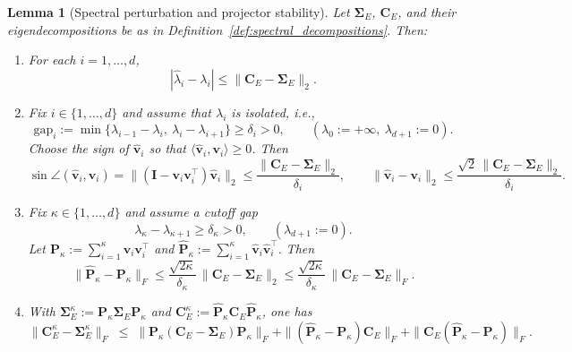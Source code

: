 \documentclass[11pt,a4paper]{article}
\newtheorem{lemma}{Lemma}
\begin{document}
\begin{lemma}[Spectral perturbation and projector stability]
\label{lem:covariance_concentration}
Let $\boldsymbol{\Sigma}_E$, $\mathbf{C}_E$, and their eigendecompositions be as in Definition~\ref{def:spectral_decompositions}. Then:
\begin{enumerate}[label=(\roman*)]
\item For each $i=1,\ldots,d$,
\begin{equation}
|\hat{\lambda}_i-\lambda_i|
\le
\|\mathbf{C}_E-\boldsymbol{\Sigma}_E\|_2 .
\end{equation}

	\item Fix $i\in\{1,\ldots,d\}$ and assume that $\lambda_i$ is isolated, i.e.,
\begin{equation}
	\mathrm{gap}_i
	:=
\min\{\lambda_{i-1}-\lambda_i,\ \lambda_i-\lambda_{i+1}\}
\ge
\delta_i>0,
\qquad
(\lambda_0:=+\infty,\ \lambda_{d+1}:=0).
\end{equation}
	Choose the sign of $\hat{\mathbf{v}}_i$ so that $\langle \hat{\mathbf{v}}_i,\mathbf{v}_i\rangle\ge 0$. Then
\begin{equation}
	\sin\angle(\hat{\mathbf{v}}_i,\mathbf{v}_i)
	=
	\|(\mathbf{I}-\mathbf{v}_i\mathbf{v}_i^\top)\hat{\mathbf{v}}_i\|_2
	\le
	\frac{\|\mathbf{C}_E-\boldsymbol{\Sigma}_E\|_2}{\delta_i},
	\qquad
	\|\hat{\mathbf{v}}_i-\mathbf{v}_i\|_2
	\le
	\frac{\sqrt{2}\,\|\mathbf{C}_E-\boldsymbol{\Sigma}_E\|_2}{\delta_i}.
\end{equation}

\item Fix $\kappa\in\{1,\ldots,d\}$ and assume a cutoff gap
\begin{equation}
\lambda_\kappa-\lambda_{\kappa+1}\ge \delta_\kappa>0,
\qquad (\lambda_{d+1}:=0).
\end{equation}
Let
\(
\mathbf{P}_\kappa:=\sum_{i=1}^{\kappa}\mathbf{v}_i\mathbf{v}_i^\top
\)
and
\(
\hat{\mathbf{P}}_\kappa:=\sum_{i=1}^{\kappa}\hat{\mathbf{v}}_i\hat{\mathbf{v}}_i^\top.
\)
	Then
\begin{equation}
	\|\hat{\mathbf{P}}_\kappa-\mathbf{P}_\kappa\|_F
	\le
	\frac{\sqrt{2\kappa}}{\delta_\kappa}\,
	\|\mathbf{C}_E-\boldsymbol{\Sigma}_E\|_2
	\le
	\frac{\sqrt{2\kappa}}{\delta_\kappa}\,
	\|\mathbf{C}_E-\boldsymbol{\Sigma}_E\|_F.
\end{equation}


\item With $\boldsymbol{\Sigma}_E^\kappa:=\mathbf{P}_\kappa\boldsymbol{\Sigma}_E\mathbf{P}_\kappa$
and $\mathbf{C}_E^\kappa:=\hat{\mathbf{P}}_\kappa\mathbf{C}_E\hat{\mathbf{P}}_\kappa$, one has
\begin{equation}
\|\mathbf{C}_E^\kappa-\boldsymbol{\Sigma}_E^\kappa\|_F
\;\le\;
\|\mathbf{P}_\kappa(\mathbf{C}_E-\boldsymbol{\Sigma}_E)\mathbf{P}_\kappa\|_F
+
\|(\hat{\mathbf{P}}_\kappa-\mathbf{P}_\kappa)\mathbf{C}_E\|_F
+
\|\mathbf{C}_E(\hat{\mathbf{P}}_\kappa-\mathbf{P}_\kappa)\|_F .
\end{equation}
\end{enumerate}
\end{lemma}
\end{document}
